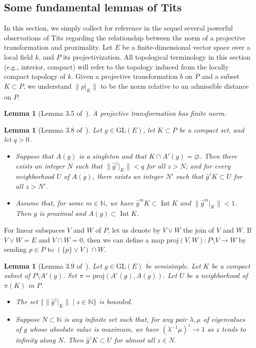 \documentclass{amsart}
\theoremstyle{plain}
\newtheorem{lemma}[theorem]{Lemma}
\theoremstyle{definition}
\theoremstyle{remark}
\DeclareMathOperator{\Int}{Int}
\providecommand{\norm}[1]{\lVert#1\rVert}
\begin{document}
\subsection{Some fundamental lemmas of Tits}\label{sec:tits}
In this section, we simply collect for reference in the sequel several powerful
observations
of Tits regarding the relationship between the norm of a projective transformation and
proximality. Let $E$ be a finite-dimensional
vector space over a local field $k$, and $P$ its projectivization. All topological
terminology in this section (e.g., interior, compact) will refer to the topology
induced from the locally compact topology of $k$. Given a projective
transformation $b$ on $P$ and a subset $K \subset P$, we understand 
$\norm{p|_{K}}$ to be the norm relative to an admissible distance on $P$.

\begin{lemma}[Lemma 3.5 of~\cite{MR44:4105}]\label{lem:3.5}
A projective transformation has finite norm.
\end{lemma}

\begin{lemma}[Lemma 3.8 of~\cite{MR44:4105}]\label{lem:3.8}
Let $g \in \mathrm{GL}(E)$, let $K \subset P$ be a compact set, and let $q >0$.
\begin{itemize}
\item[(i)] Suppose that $A(g)$ is a singleton and that $K \cap A'(g) = \varnothing$. Then
there exists an integer $N$ such that $\norm{\widehat{g}^{z}|_{K}} < q$ for all $z >
N$; and for every neighborhood $U$ of $A(g)$, there exists an integer $N'$ such that
$\widehat{g}^{z} K \subset U$ for all $z > N'$.
\item[(ii)] Assume that, for some $m \in \mathbb{N}$, we have $\widehat{g}^{m} K \subset
\Int K$ and $\norm{\widehat{g}^{m}|_{K}} < 1$. Then $g$ is proximal and $A(g)
\subset \Int K$.
\end{itemize}
\end{lemma}

For linear subspaces $V$ and $W$ of $P$, let us denote by $V\vee W$ the join of $V$ and
$W$. If $V \vee W = E$ and $V\cap W= 0$,
then we can define a map $\mathrm{proj}(V, W):P\setminus V
\to W$ by sending $p \in P$ to $(\{p\}\vee V)\cap W$.

\begin{lemma}[Lemma 3.9 of~\cite{MR44:4105}]\label{lem:3.9}
Let $g \in \mathrm{GL}(E)$ be semisimple. Let $K$ be a compact subset of $P\setminus A'(g)$.
Set $\pi = \mathrm{proj}(A'(g), A(g))$. Let $U$ be a neighborhood of $\pi(K)$ in $P$.
\begin{itemize}
\item[(i)] The set $\{\norm{\widehat{g}^{z}|_{K}} \mid z \in \mathbb{N}\}$
is bounded.
\item[(ii)] Suppose $N \subset \mathbb{N}$ is any infinite set such that, for any pair
$\lambda, \mu$ of eigenvalues of $g$ whose absolute value is maximum, we have
$(\lambda^{-1}\mu)^{z} \to 1$ as $z$ tends to infinity along $N$. Then $\widehat{g}^{z}K
\subset U$ for almost all $z \in N$.
\end{itemize}
\end{lemma}
\end{document}
